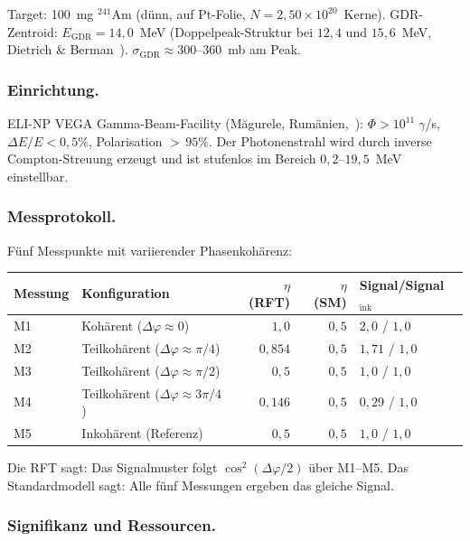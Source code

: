 \documentclass[12pt]{iopart}
\begin{document}
	Target: 100~mg ${}^{241}$Am (d\"unn, auf Pt-Folie,
	$N = 2{,}50 \times 10^{20}$~Kerne). GDR-Zentroid:
	$E_{\mathrm{GDR}} = 14{,}0$~MeV (Doppelpeak-Struktur bei
	$12{,}4$ und $15{,}6$~MeV,
	Dietrich \& Berman~\cite{dietrich1988}).
	$\sigma_{\mathrm{GDR}} \approx 300$--$360$~mb am Peak.
	
	\subsubsection{Einrichtung.}
	
	ELI-NP VEGA Gamma-Beam-Facility
	(M\u{a}gurele, Rum\"anien,~\cite{elinp2024}):
	$\Phi > 10^{11}\;\gamma$/s, $\Delta E/E < 0{,}5\%$,
	Polarisation ${>}\,95\%$. Der Photonenstrahl wird durch
	inverse Compton-Streuung erzeugt und ist stufenlos im Bereich
	$0{,}2$--$19{,}5$~MeV einstellbar.
	
	\subsubsection{Messprotokoll.}
	
	F\"unf Messpunkte mit variierender Phasenkoh\"arenz:
	
	\begin{center}
		\small
		\begin{tabular}{llrrl}
			\hline
			\textbf{Messung} & \textbf{Konfiguration}
			& $\eta$ \textbf{(RFT)} & $\eta$ \textbf{(SM)}
			& \textbf{Signal/Signal$_{\mathrm{ink}}$} \\
			\hline
			M1 & Koh\"arent ($\Delta\varphi \approx 0$)
			& $1{,}0$ & $0{,}5$ & $2{,}0$ / $1{,}0$ \\
			M2 & Teilkoh\"arent ($\Delta\varphi \approx \pi/4$)
			& $0{,}854$ & $0{,}5$ & $1{,}71$ / $1{,}0$ \\
			M3 & Teilkoh\"arent ($\Delta\varphi \approx \pi/2$)
			& $0{,}5$ & $0{,}5$ & $1{,}0$ / $1{,}0$ \\
			M4 & Teilkoh\"arent ($\Delta\varphi \approx 3\pi/4$)
			& $0{,}146$ & $0{,}5$ & $0{,}29$ / $1{,}0$ \\
			M5 & Inkoh\"arent (Referenz)
			& $0{,}5$ & $0{,}5$ & $1{,}0$ / $1{,}0$ \\
			\hline
		\end{tabular}
	\end{center}
	
	Die RFT sagt: Das Signalmuster folgt $\cos^2(\Delta\varphi/2)$
	\"uber M1--M5. Das Standardmodell sagt: Alle f\"unf Messungen
	ergeben das gleiche Signal.
	
	\subsubsection{Signifikanz und Ressourcen.}
	
\end{document}

